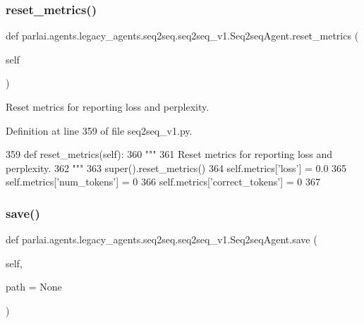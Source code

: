 \subsubsection{\texorpdfstring{reset\+\_\+metrics()}{reset\_metrics()}}
{\footnotesize\ttfamily def parlai.\+agents.\+legacy\+\_\+agents.\+seq2seq.\+seq2seq\+\_\+v1.\+Seq2seq\+Agent.\+reset\+\_\+metrics (\begin{DoxyParamCaption}\item[{}]{self }\end{DoxyParamCaption})}

\begin{DoxyVerb}Reset metrics for reporting loss and perplexity.
\end{DoxyVerb}
 

Definition at line 359 of file seq2seq\+\_\+v1.\+py.


\begin{DoxyCode}
359     \textcolor{keyword}{def }reset\_metrics(self):
360         \textcolor{stringliteral}{"""}
361 \textcolor{stringliteral}{        Reset metrics for reporting loss and perplexity.}
362 \textcolor{stringliteral}{        """}
363         super().reset\_metrics()
364         self.metrics[\textcolor{stringliteral}{'loss'}] = 0.0
365         self.metrics[\textcolor{stringliteral}{'num\_tokens'}] = 0
366         self.metrics[\textcolor{stringliteral}{'correct\_tokens'}] = 0
367 
\end{DoxyCode}
\mbox{\label{classparlai_1_1agents_1_1legacy__agents_1_1seq2seq_1_1seq2seq__v1_1_1Seq2seqAgent_a8aa6a1efae9091dc0b38af3ce4b49706}} 
\subsubsection{\texorpdfstring{save()}{save()}}
{\footnotesize\ttfamily def parlai.\+agents.\+legacy\+\_\+agents.\+seq2seq.\+seq2seq\+\_\+v1.\+Seq2seq\+Agent.\+save (\begin{DoxyParamCaption}\item[{}]{self,  }\item[{}]{path = {\ttfamily None} }\end{DoxyParamCaption})}

